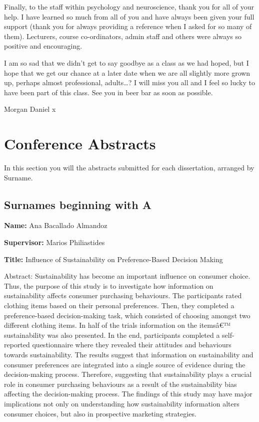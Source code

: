 \documentclass[]{book}
\begin{document}
\begin{info2}
Finally, to the staff within psychology and neuroscience, thank you for
all of your help. I have learned so much from all of you and have always
been given your full support (thank you for always providing a reference
when I asked for so many of them). Lecturers, course co-ordinators,
admin staff and others were always so positive and encouraging.

I am so sad that we didn't get to say goodbye as a class as we had
hoped, but I hope that we get our chance at a later date when we are all
slightly more grown up, perhaps almost professional, adults\ldots{}? I
will miss you all and I feel so lucky to have been part of this class.
See you in beer bar as soon as possible.

Morgan Daniel x
\end{info2}

\hypertarget{conference-abstracts}{%
\chapter*{Conference Abstracts}\label{conference-abstracts}}

In this section you will the abstracts submitted for each dissertation, arranged by Surname.

\hypertarget{surnames-beginning-with-a}{%
\section*{Surnames beginning with A}\label{surnames-beginning-with-a}}

\textbf{Name:} Ana Bacallado Almandoz

\textbf{Supervisor:} Marios Philiastides

\textbf{Title:} Influence of Sustainability on Preference-Based Decision Making

Abstract: Sustainability has become an important influence on consumer choice. Thus, the purpose of this study is to investigate how information on sustainability affects consumer purchasing behaviours. The participants rated clothing items based on their personal preferences. Then, they completed a preference-based decision-making task, which consisted of choosing amongst two different clothing items. In half of the trials information on the itemsâ€™ sustainability was also presented. In the end, participants completed a self-reported questionnaire where they revealed their attitudes and behaviours towards sustainability. The results suggest that information on sustainability and consumer preferences are integrated into a single source of evidence during the decision-making process. Therefore, suggesting that sustainability plays a crucial role in consumer purchasing behaviours as a result of the sustainability bias affecting the decision-making process. The findings of this study may have major implications not only on understanding how sustainability information alters consumer choices, but also in prospective marketing strategies.
\end{document}
